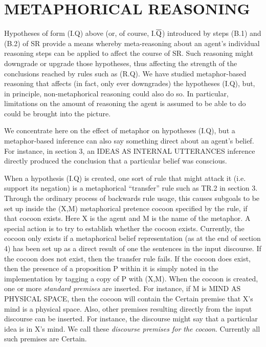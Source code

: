 \section{METAPHORICAL REASONING} %

Hypotheses of form (I.Q) above (or, of course, I.$\overline{{\rm Q}}$)
introduced by steps (B.1) and (B.2) of SR provide a means whereby
meta-reasoning about an agent's individual reasoning steps can be applied to
affect the course of SR.  Such reasoning might downgrade or upgrade those
hypotheses, thus affecting the strength of the conclusions reached by rules
such as (R.Q). We have studied metaphor-based reasoning that affects (in fact,
only ever downgrades) the hypotheses (I.Q), but, in principle, non-metaphorical
reasoning could also do so. In particular, limitations on the amount of
reasoning the agent is assumed to be able to do could be brought into the
picture.

We concentrate here on the effect of metaphor on hypotheses (I.Q), but a
metaphor-based inference can also say something direct about an agent's belief.
For instance, in section 3, an IDEAS AS INTERNAL UTTERANCES inference directly
produced the conclusion that a particular belief was conscious.

When a hypothesis (I.Q) is created, one sort of rule that might attack it (i.e.
support its negation) is a metaphorical ``transfer'' rule such as TR.2 in
section 3.  Through the ordinary process of backwards rule usage, this causes
subgoals to be set up inside the (X,M) metaphorical pretence cocoon specified
by the rule, if that cocoon exists. Here X is the agent and M is the name of
the metaphor.  A special action is to try to establish whether the cocoon
exists.  Currently, the cocoon only exists if a metaphorical belief
representation (as at the end of section 4) has been set up as a direct
result of one the sentences in the input discourse. If the cocoon does not
exist, then the transfer rule fails.  If the cocoon does exist, then the
presence of a proposition P within it is simply noted in the implementation by
tagging a copy of P with (X,M).  When the cocoon is created, one or more {\it
standard premises} are inserted.  For instance, if M is MIND AS PHYSICAL SPACE,
then the cocoon will contain the Certain premise that X's mind is a physical
space.  Also, other premises resulting directly from the input discourse can be
inserted.  For instance, the discourse might say that a particular idea is in
X's mind. We call these {\it discourse premises for the cocoon}. Currently all
such premises are Certain.

